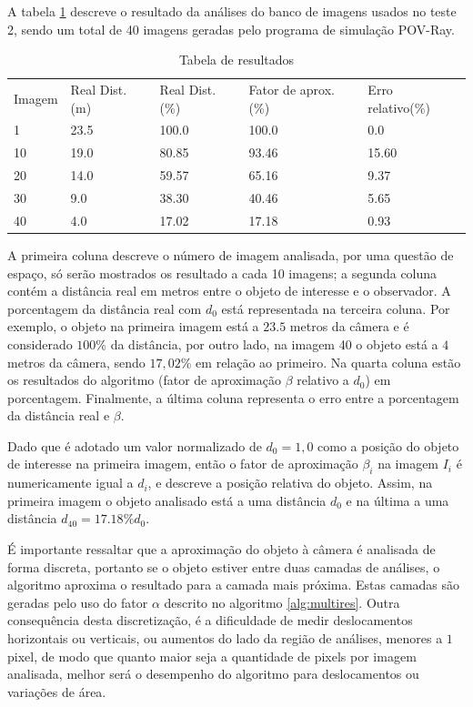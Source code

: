 A tabela \ref{tab:tab1} descreve o resultado da análises do banco 
de imagens usados no teste 2, sendo um total de 40 imagens geradas
pelo programa de simulação POV-Ray.
\begin{table}[H]
\setlength{\tabcolsep}{1 pt} 
\caption{Tabela de resultados}
\begin{tabular}{lllll}
Imagem & Real Dist.(m) & Real Dist.(\%) & Fator de aprox.(\%) & Erro relativo(\%)\\
1 & 23.5 & 100.0 & 100.0 & 0.0 \\
10 & 19.0 & 80.85 & 93.46 & 15.60 \\
20 & 14.0 & 59.57 & 65.16 & 9.37 \\
30 & 9.0 & 38.30 & 40.46 & 5.65 \\
40 & 4.0 & 17.02 & 17.18 & 0.93
\end{tabular}
\label{tab:tab1}
\end{table}
A primeira coluna descreve o número de imagem analisada, por uma questão de espaço, só serão mostrados
os resultado a cada 10 imagens; a segunda coluna contém a distância 
real em metros entre o objeto de interesse e o observador.
A porcentagem da distância real com $d_0$ está representada na terceira coluna. Por exemplo, o objeto na primeira imagem
está a $23.5$ metros da câmera e é considerado $100$\% da distância, por outro lado, na imagem 40 o objeto está a
$4$ metros da câmera, sendo $17,02$\% em relação ao primeiro. Na quarta coluna estão os resultados do algoritmo (fator
de aproximação $\beta$ relativo a $d_0$) em porcentagem. Finalmente, a última coluna representa o erro 
entre a porcentagem da distância real e $\beta$.

Dado que é adotado um valor normalizado de $d_0=1,0$ como a posição do objeto de interesse na primeira 
imagem, então o fator de aproximação $\beta_i$ na imagem $I_i$ é 
numericamente igual a $d_i$, e descreve a posição relativa do objeto.
Assim, na primeira imagem o objeto analisado está a uma distância $d_0$
e na última a uma distância $d_{40}=17.18\%d_0$.

É importante ressaltar que a aproximação do objeto à câmera é analisada de forma discreta, 
portanto se o objeto
estiver entre duas camadas de análises, o algoritmo aproxima o resultado para
a camada mais próxima. Estas camadas são geradas pelo uso do fator $\alpha$
descrito no algoritmo \ref{alg:multires}. Outra consequência desta discretização,
é a dificuldade de medir deslocamentos horizontais ou verticais, ou aumentos do lado da região de análises,
menores a $1$ pixel, de modo que quanto maior seja a quantidade de pixels por
imagem analisada, melhor será o desempenho do algoritmo para deslocamentos ou variações de área.

